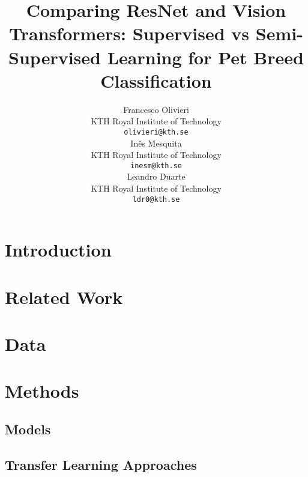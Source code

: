\documentclass{article}
\title{Comparing ResNet and Vision Transformers: Supervised vs Semi-Supervised Learning for Pet Breed Classification}
\author{%
  Francesco Olivieri \\
  KTH Royal Institute of Technology \\
  \texttt{olivieri@kth.se} \\
  \And
  Inês Mesquita \\
  KTH Royal Institute of Technology \\
  \texttt{inesm@kth.se} \\
  \And
  Leandro Duarte \\
  KTH Royal Institute of Technology \\
  \texttt{ldr0@kth.se} \\
}
\begin{document}
\maketitle

\begin{abstract}
\end{abstract}

\section{Introduction}



\section{Related Work}


\section{Data}


\section{Methods}


\subsection{Models}


\subsection{Transfer Learning Approaches}
\end{document}
